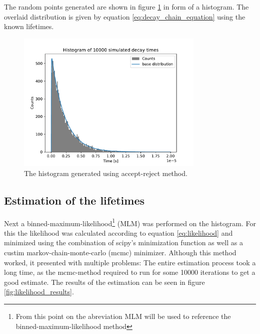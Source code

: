 \documentclass[11pt, a4paper, oneside]{book}
\newcommand\Plotwidth{0.8}
\begin{document}
The random points generated are shown in figure \ref{fig:histogram} in form of a histogram. The overlaid distribution is given by equation \ref{eq:decay_chain_equation} using the known lifetimes.


\begin{figure}[H]
    \centering
    \includegraphics[width=\Plotwidth\textwidth]{images/simulated_decay_histogram_150bins.pdf}
    \caption{The histogram generated using accept-reject method.}
    \label{fig:histogram}
\end{figure}

\subsection{Estimation of the lifetimes}
Next a binned-maximum-likelihood\footnote{From this point on the abreviation MLM will be used to reference the binned-maximum-likelihood method} (MLM) was performed on the histogram. For this the likelihood was calculated according to equation \ref{eq:likelihood} and minimized using the combination of scipy's minimization function as well as a custim markov-chain-monte-carlo (mcmc) minimizer. Although this method worked, it presented with multiple problems: The entire estimation process took a long time, as the mcmc-method required to run for some \num{10000} iterations to get a good estimate. The results of the estimation can be seen in figure \ref{fig:likelihood_results}.
\end{document}
